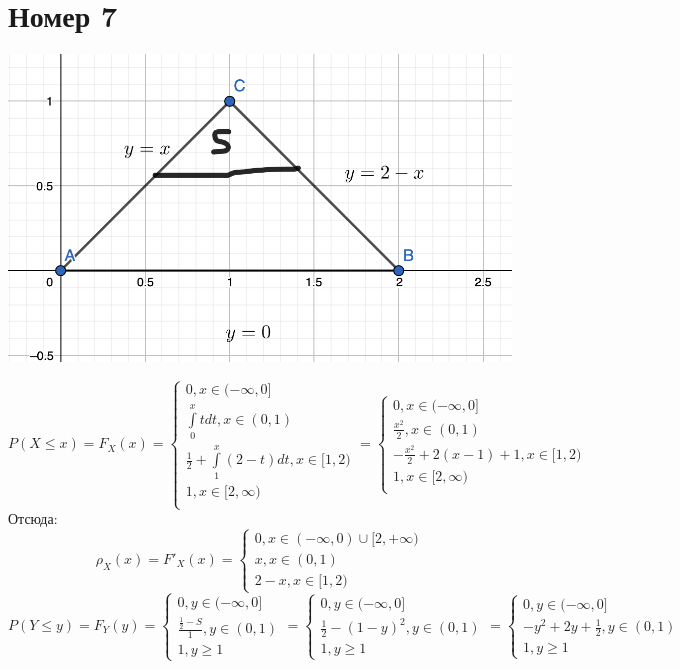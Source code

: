 \documentclass[a4paper,12pt]{article}
\begin{document}
\section*{Номер 7}
\begin{center}
\includegraphics[scale=0.5]{1.png}
\end{center}
\[
P(X \leq x) = F_X(x) = 
\begin{cases}
0, x \in (-\infty, 0] \\
\int\limits_0^x tdt,  x \in (0, 1)\\
\frac12 + \int\limits_1^x (2-t)dt, x \in [1, 2) \\
1, x \in [2, \infty) \\
\end{cases}
=
\begin{cases}
0, x \in (-\infty, 0] \\
\frac{x^2}{2}, x \in (0, 1) \\
-\frac{x^2}{2} + 2(x-1) + 1, x \in [1, 2) \\
1, x \in [2, \infty) \\
\end{cases}
\]
Отсюда:
\[
\rho_X(x) = F'_X(x)  = \begin{cases}
0, x \in (-\infty, 0) \cup [2, +\infty) \\
x, x \in (0, 1) \\
2 - x, x \in [1, 2)
\end{cases}
\]
\[
P(Y \leq y) = F_Y(y) = \begin{cases}
0, y \in (-\infty, 0] \\
\frac{\frac12 - S}{1}, y \in (0, 1) \\
1, y \geq 1
\end{cases}
=
\begin{cases}
0, y \in (-\infty, 0] \\
\frac{1}{2} - (1-y)^2, y \in (0, 1) \\
1, y \geq 1
\end{cases} 
=
\begin{cases}
0, y \in (-\infty, 0] \\
-y^2 + 2y + \frac12, y \in (0, 1) \\
1, y \geq 1
\end{cases} 
\]
\end{document}
